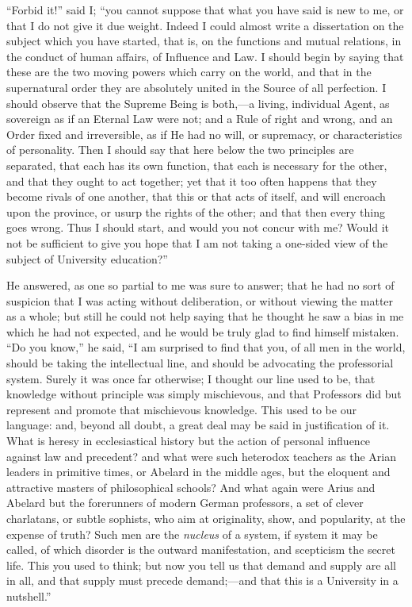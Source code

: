 ``Forbid it!'' said I; ``you cannot suppose that what
you have said is new to me, or that I do not give it due weight.
Indeed I could almost write a dissertation on the subject which you
have started, that is, on the functions and mutual relations, in the
conduct of human affairs, of Influence and Law. I should begin by
saying that these are the two moving powers which carry on the world,
and that in the supernatural order they are absolutely united in the
Source of all perfection. I should observe that the Supreme Being is
both,—a living, individual Agent, as sovereign as if an Eternal Law
were not; and a Rule of right and wrong, and an Order fixed and
irreversible, as if He had no will, or supremacy, or characteristics
of personality. Then I should say that here below the two principles
are separated, that each has its own function, that each is necessary
for the other, and that they ought to act together; yet that it too
often happens that they become rivals of one another, that this or
that acts of itself, and will encroach upon the province, or usurp the
rights of the other; and that then every thing goes wrong. Thus I
should start, and would you not concur with me? Would it not be
sufficient to give you hope that I am not taking a one-sided view of
the subject of University education?''

He answered, as one so partial to me was sure to answer; that he
had no sort of suspicion that I was acting without deliberation, or
without viewing the matter as a whole; but still he could not help
saying that he thought he saw a bias in me which he had not
expected, and he would be truly glad to find himself mistaken.
``Do you know,'' he said, ``I am surprised to find that
you, of all men in the world, should be taking the intellectual line,
and should be advocating the professorial system. Surely it was once
far otherwise; I thought our line used to be, that knowledge without
principle was simply mischievous, and that Professors did but
represent and promote that mischievous knowledge. This used to be our
language: and, beyond all doubt, a great deal may be said in
justification of it. What is heresy in ecclesiastical history but the
action of personal influence against law and precedent? and what were
such heterodox teachers as the Arian leaders in primitive times, or
Abelard in the middle ages, but the eloquent and attractive masters of
philosophical schools? And what again were Arius and Abelard but the
forerunners of modern German professors, a set of clever charlatans,
or subtle sophists, who aim at originality, show, and popularity, at
the expense of truth? Such men are the \emph{nucleus} of a system, if
system it may be called, of which disorder is the outward
manifestation, and scepticism the secret life. This you used to think;
but now you tell us that demand and supply are all in all, and that
supply must precede demand;—and that this is a University in a
nutshell.''

